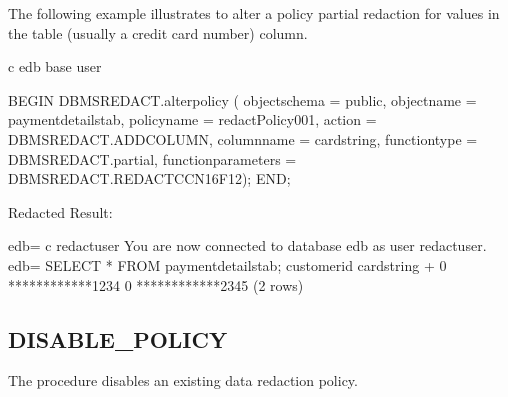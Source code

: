 \documentclass[letterpaper,10pt,english,openany,oneside]{sphinxmanual}
\begin{document}

The following example illustrates to alter a policy  partial
redaction for values in the  table 
(usually a credit card number) column.

%
\begin{sphinxVerbatim}[commandchars=\\\{\}]
\PYGZbs{}c edb base \PYGZus{}user

    BEGIN
      DBMS\PYGZus{}REDACT.alter\PYGZus{}policy (
            object\PYGZus{}schema               =\PYGZgt{} \PYGZsq{}public\PYGZsq{},
            object\PYGZus{}name                 =\PYGZgt{} \PYGZsq{}payment\PYGZus{}details\PYGZus{}tab\PYGZsq{},
            policy\PYGZus{}name                 =\PYGZgt{} \PYGZsq{}redactPolicy\PYGZus{}001\PYGZsq{},
            action                      =\PYGZgt{} DBMS\PYGZus{}REDACT.ADD\PYGZus{}COLUMN,
            column\PYGZus{}name                 =\PYGZgt{} \PYGZsq{}card\PYGZus{}string\PYGZsq{},
            function\PYGZus{}type               =\PYGZgt{} DBMS\PYGZus{}REDACT.partial,
            function\PYGZus{}parameters         =\PYGZgt{} DBMS\PYGZus{}REDACT.REDACT\PYGZus{}CCN16\PYGZus{}F12);
    END;
\end{sphinxVerbatim}

Redacted Result:

%
\begin{sphinxVerbatim}[commandchars=\\\{\}]
edb=\PYGZsh{} \PYGZbs{}c \PYGZhy{} redact\PYGZus{}user
You are now connected to database \PYGZdq{}edb\PYGZdq{} as user \PYGZdq{}redact\PYGZus{}user\PYGZdq{}.
edb=\PYGZgt{} SELECT * FROM payment\PYGZus{}details\PYGZus{}tab;
 customer\PYGZus{}id \textbar{}     card\PYGZus{}string
\PYGZhy{}\PYGZhy{}\PYGZhy{}\PYGZhy{}\PYGZhy{}\PYGZhy{}\PYGZhy{}\PYGZhy{}\PYGZhy{}\PYGZhy{}\PYGZhy{}\PYGZhy{}\PYGZhy{}+\PYGZhy{}\PYGZhy{}\PYGZhy{}\PYGZhy{}\PYGZhy{}\PYGZhy{}\PYGZhy{}\PYGZhy{}\PYGZhy{}\PYGZhy{}\PYGZhy{}\PYGZhy{}\PYGZhy{}\PYGZhy{}\PYGZhy{}\PYGZhy{}\PYGZhy{}\PYGZhy{}\PYGZhy{}\PYGZhy{}\PYGZhy{}
           0 \textbar{} ****\PYGZhy{}****\PYGZhy{}****\PYGZhy{}1234
           0 \textbar{} ****\PYGZhy{}****\PYGZhy{}****\PYGZhy{}2345
(2 rows)
\end{sphinxVerbatim}

\newpage


\subsection{DISABLE\_POLICY}
\label{\detokenize{dbms_redact:disable-policy}}
The  procedure disables an existing data redaction
policy.
\end{document}
